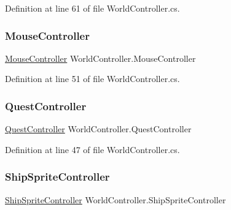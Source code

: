 Definition at line 61 of file World\+Controller.\+cs.

\mbox{\label{class_world_controller_abf96a102fb4ae34e384a5970cd590c0b}} 
\subsubsection{\texorpdfstring{Mouse\+Controller}{MouseController}}
{\footnotesize\ttfamily \hyperlink{class_mouse_controller}{Mouse\+Controller} World\+Controller.\+Mouse\+Controller\hspace{0.3cm}{\ttfamily [get]}}



Definition at line 51 of file World\+Controller.\+cs.

\mbox{\label{class_world_controller_a8bd360e6ff51d5b2d3dffd19beafb0af}} 
\subsubsection{\texorpdfstring{Quest\+Controller}{QuestController}}
{\footnotesize\ttfamily \hyperlink{class_quest_controller}{Quest\+Controller} World\+Controller.\+Quest\+Controller\hspace{0.3cm}{\ttfamily [get]}}



Definition at line 47 of file World\+Controller.\+cs.

\mbox{\label{class_world_controller_a3e1d3be982c9f45b87510dcfad807986}} 
\subsubsection{\texorpdfstring{Ship\+Sprite\+Controller}{ShipSpriteController}}
{\footnotesize\ttfamily \hyperlink{class_ship_sprite_controller}{Ship\+Sprite\+Controller} World\+Controller.\+Ship\+Sprite\+Controller\hspace{0.3cm}{\ttfamily [get]}}



